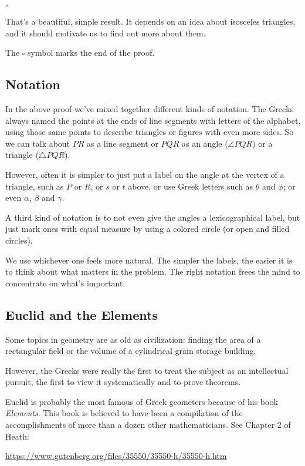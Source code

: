 \documentclass[11pt, oneside]{article}
\begin{document}
$\square$

That's a beautiful, simple result.  It depends on an idea about isosceles triangles, and it should motivate us to find out more about them.

The $\square$ symbol marks the end of the proof.

\subsection*{Notation}
In the above proof we've mixed together different kinds of notation.  The Greeks always named the points at the ends of line segments with letters of the alphabet, using those same points to describe triangles or figures with even more sides.  So we can talk about $PR$ as a line segment or $PQR$ as an angle ($\angle PQR$) or a triangle ($\triangle PQR$).

However, often it is simpler to just put a label on the angle at the vertex of a triangle, such as $P$ or $R$, or $s$ or $t$ above, or use Greek letters such as $\theta$ and $\phi$; or even $\alpha$, $\beta$ and $\gamma$. 

 A third kind of notation is to not even give the angles a lexicographical label, but just mark ones with equal measure by using a colored circle (or open and filled circles).

We use whichever one feels more natural. The simpler the labels, the easier it is to think about what matters in the problem.  The right notation frees the mind to concentrate on what's important.

\subsection*{Euclid and the Elements}

Some topics in geometry are as old as civilization:  finding the area of a rectangular field or the volume of a cylindrical grain storage building.

However, the Greeks were really the first to treat the subject as an intellectual pursuit, the first to view it systematically and to prove theorems.

Euclid is probably the most famous of Greek geometers because of his book \emph{Elements}.  This book is believed to have been a compilation of the accomplishments of more than a dozen other mathematicians.  See Chapter 2 of Heath:

\url{https://www.gutenberg.org/files/35550/35550-h/35550-h.htm}
\end{document}
